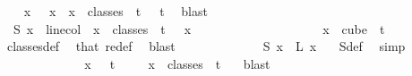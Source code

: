 \begin{isabellebody}
\ \isamarkupfalse%
\ {\isacharasterisk}{\kern0pt}{\isacharasterisk}{\kern0pt}{\isacharcolon}{\kern0pt}\ {\isachardoublequoteopen}{\isacharbraceleft}{\kern0pt}x\ {}\ {\isacharbar}{\kern0pt}\ x\ {\isachardot}{\kern0pt}\ x\ {\isasymin}\ classes\ {}\ t\ {}{\isacharbraceright}{\kern0pt}\ {\isacharequal}{\kern0pt}\ {\isacharbraceleft}{\kern0pt}{\isachardot}{\kern0pt}{\isachardot}{\kern0pt}{\isacharless}{\kern0pt}t{\isacharbraceright}{\kern0pt}{\isachardoublequoteclose}\ \isamarkupfalse%
\ blast\isanewline
\isanewline
\ \ \ \ \ \ \ \ \isamarkupfalse%
\ {\isachardoublequoteopen}{\isasymchi}\ {\isacharparenleft}{\kern0pt}S{}\ x{\isacharparenright}{\kern0pt}\ {\isacharequal}{\kern0pt}\ linecol{\isachardoublequoteclose}\ \ {\isachardoublequoteopen}x\ {\isasymin}\ classes\ {}\ t\ {}{\isachardoublequoteclose}\ \ x\isanewline
\ \ \ \ \ \ \ \ \isamarkupfalse%
{\isacharminus}{\kern0pt}\isanewline
\ \ \ \ \ \ \ \ \ \ \isamarkupfalse%
\ {\isachardoublequoteopen}x\ {\isasymin}\ cube\ {}\ {\isacharparenleft}{\kern0pt}t{\isacharplus}{\kern0pt}{}{\isacharparenright}{\kern0pt}{\isachardoublequoteclose}\ \isamarkupfalse%
\ classes{\isacharunderscore}{\kern0pt}def\ \isamarkupfalse%
\ that\ redef\ \isamarkupfalse%
\ blast\isanewline
\ \ \ \ \ \ \ \ \ \ \isamarkupfalse%
\ \isamarkupfalse%
\ {\isachardoublequoteopen}S{}\ x\ {\isacharequal}{\kern0pt}\ L{\isacharprime}{\kern0pt}\ {\isacharparenleft}{\kern0pt}x\ {}{\isacharparenright}{\kern0pt}{\isachardoublequoteclose}\ \isamarkupfalse%
\ S{}{\isacharunderscore}{\kern0pt}def\ \isamarkupfalse%
\ simp\isanewline
\ \ \ \ \ \ \ \ \ \ \isamarkupfalse%
\ \isamarkupfalse%
\ {\isachardoublequoteopen}x\ {}\ {\isasymin}\ {\isacharbraceleft}{\kern0pt}{\isachardot}{\kern0pt}{\isachardot}{\kern0pt}{\isacharless}{\kern0pt}t{\isacharbraceright}{\kern0pt}{\isachardoublequoteclose}\ \isamarkupfalse%
\ {\isacharasterisk}{\kern0pt}{\isacharasterisk}{\kern0pt}\ \isamarkupfalse%
\ {\isacartoucheopen}x\ {\isasymin}\ classes\ {}\ t\ {}{\isacartoucheclose}\ \isamarkupfalse%
\ blast\isanewline
\ \ \ \ \ \ \ \ \ \ \isamarkupfalse%
\ \isamarkupfalse%

\end{isabellebody}
